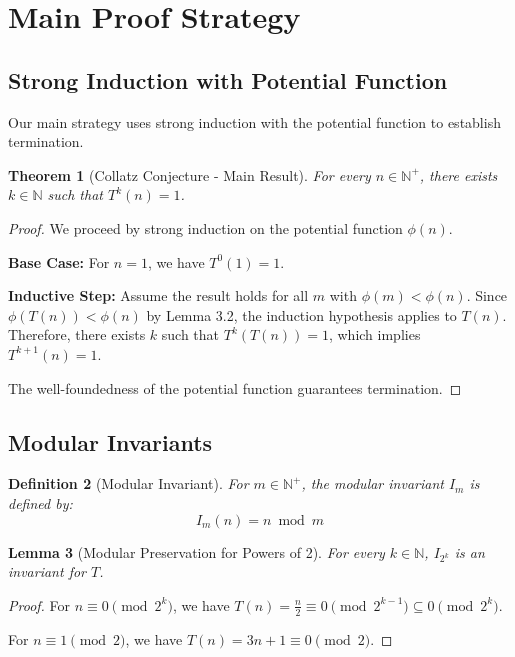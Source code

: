 \documentclass[11pt,a4paper]{article}
\newtheorem{theorem}{Theorem}[section]
\newtheorem{lemma}[theorem]{Lemma}
\newtheorem{definition}[theorem]{Definition}
\begin{document}
\section{Main Proof Strategy}

\subsection{Strong Induction with Potential Function}

Our main strategy uses strong induction with the potential function to establish termination.

\begin{theorem}[Collatz Conjecture - Main Result]
For every $n \in \mathbb{N}^+$, there exists $k \in \mathbb{N}$ such that $T^k(n) = 1$.
\end{theorem}

\begin{proof}
We proceed by strong induction on the potential function $\phi(n)$.

\textbf{Base Case:} For $n = 1$, we have $T^0(1) = 1$.

\textbf{Inductive Step:} Assume the result holds for all $m$ with $\phi(m) < \phi(n)$. Since $\phi(T(n)) < \phi(n)$ by Lemma 3.2, the induction hypothesis applies to $T(n)$. Therefore, there exists $k$ such that $T^k(T(n)) = 1$, which implies $T^{k+1}(n) = 1$.

The well-foundedness of the potential function guarantees termination.
\end{proof}

\subsection{Modular Invariants}

\begin{definition}[Modular Invariant]
For $m \in \mathbb{N}^+$, the modular invariant $I_m$ is defined by:
\begin{equation}
I_m(n) = n \bmod m
\end{equation}
\end{definition}

\begin{lemma}[Modular Preservation for Powers of 2]
For every $k \in \mathbb{N}$, $I_{2^k}$ is an invariant for $T$.
\end{lemma}

\begin{proof}
For $n \equiv 0 \pmod{2^k}$, we have $T(n) = \frac{n}{2} \equiv 0 \pmod{2^{k-1}} \subseteq 0 \pmod{2^k}$.

For $n \equiv 1 \pmod{2}$, we have $T(n) = 3n + 1 \equiv 0 \pmod{2}$.
\end{proof}
\end{document}
